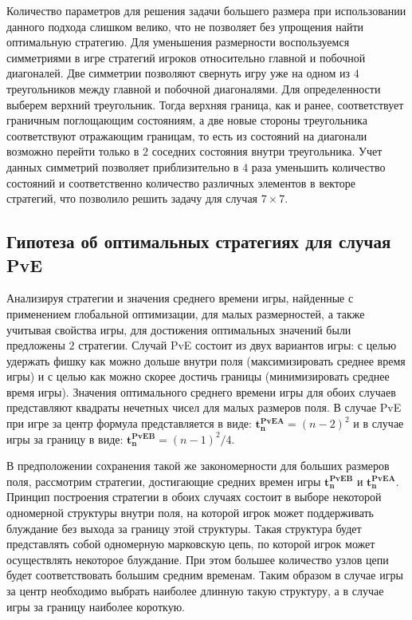 Количество параметров для решения задачи большего размера при использовании данного подхода слишком велико, что не позволяет без упрощения найти оптимальную стратегию.
Для уменьшения размерности воспользуемся симметриями в игре стратегий игроков относительно главной и побочной диагоналей. 
Две симметрии позволяют свернуть игру уже на одном из $4$ треугольников между главной и побочной диагоналями. 
Для определенности выберем верхний треугольник. Тогда верхняя граница, как и ранее, соответствует граничным поглощающим состояниям,
а две новые стороны треугольника соответствуют отражающим границам, то есть из состояний на диагонали возможно перейти только в $2$ соседних состояния внутри треугольника.
Учет данных симметрий позволяет приблизительно в $4$ раза уменьшить количество состояний и соответственно количество различных элементов в векторе стратегий,
что позволило решить задачу для случая $7 \times 7$. 

\subsection{Гипотеза об оптимальных стратегиях для случая PvE}\label{subsec:ch3/sec1/sub1}

Анализируя стратегии и значения среднего времени игры, найденные с применением глобальной оптимизации, для малых размерностей,
а также учитывая свойства игры, для достижения оптимальных значений были предложены $2$ стратегии.
Случай PvE состоит из двух вариантов игры: с целью удержать фишку как можно дольше внутри поля (максимизировать среднее время игры)
и с целью как можно скорее достичь границы (минимизировать среднее время игры). 
Значения оптимального среднего времени игры для обоих случаев представляют квадраты нечетных чисел для малых размеров поля.
В случае PvE при игре за центр формула представляется в виде: $\boldsymbol{t_n^{PvE A}} = (n-2)^2$ и в случае
игры за границу в виде: $\boldsymbol{t_n^{PvE B}} = (n-1)^2/4$.

В предположении сохранения такой же закономерности для больших размеров поля, рассмотрим стратегии, достигающие
средних времен игры $\boldsymbol{t_n^{PvE B}}$ и $\boldsymbol{t_n^{PvE A}}$. Принцип построения стратегии в обоих случаях 
состоит в выборе некоторой одномерной структуры внутри поля, на которой игрок может поддерживать блуждание без выхода за границу этой структуры.
Такая структура будет представлять собой одномерную марковскую цепь, по которой игрок может осуществлять некоторое блуждание.
При этом большее количество узлов цепи будет соответствовать большим средним временам. Таким образом в случае игры за центр
необходимо выбрать наиболее длинную такую структуру, а в случае игры за границу наиболее короткую.

